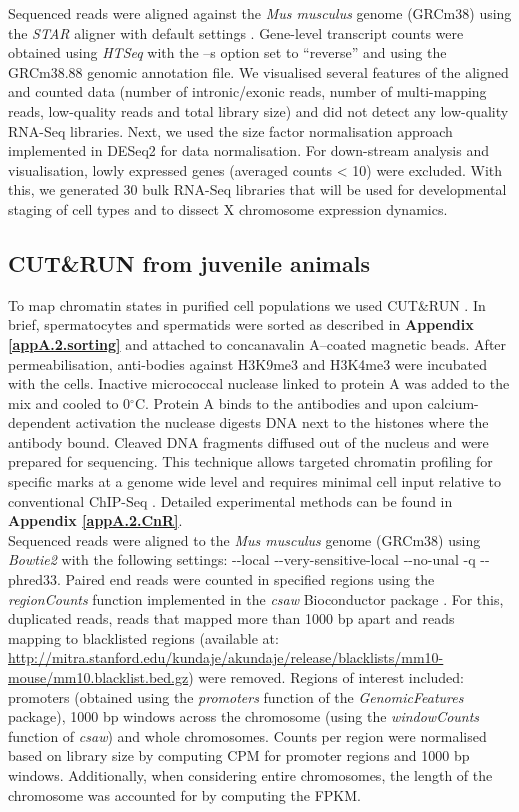 Sequenced reads were aligned against the \textit{Mus musculus} genome (GRCm38) using the \emph{STAR} aligner with default settings \citep{Dobin2013}. 
Gene-level transcript counts were obtained using \emph{HTSeq} \citep{Anders2014} with the –s option set to “reverse” and using the GRCm38.88 genomic annotation file. 
We visualised several features of the aligned and counted data (number of intronic/exonic reads, number of multi-mapping reads, low-quality reads and total library size) and did not detect any low-quality RNA-Seq libraries. 
Next, we used the size factor normalisation approach implemented in DESeq2 \citep{Love2014} for data normalisation. 
For down-stream analysis and visualisation, lowly expressed genes (averaged counts < 10) were excluded. 
With this, we generated 30 bulk RNA-Seq libraries that will be used for developmental staging of cell types and to dissect X chromosome expression dynamics.

\subsection{CUT\&{}RUN from juvenile animals}

To map chromatin states in purified cell populations we used CUT\&{}RUN \citep{Skene2018}. 
In brief, spermatocytes and spermatids were sorted as described in \textbf{Appendix \ref{appA.2.sorting}} and attached to concanavalin A–coated magnetic beads. 
After permeabilisation, anti-bodies against H3K9me3 and H3K4me3 were incubated with the cells. 
Inactive micrococcal nuclease linked to protein A was added to the mix and cooled to 0$^\circ$C. 
Protein A binds to the antibodies and upon calcium-dependent activation the nuclease digests DNA next to the histones where the antibody bound. Cleaved DNA fragments diffused out of the nucleus and were prepared for sequencing. 
This technique allows targeted chromatin profiling for specific marks at a genome wide level and requires minimal cell input relative to conventional ChIP-Seq \citep{Skene2018}. 
Detailed experimental methods can be found in \textbf{Appendix \ref{appA.2.CnR}}.\\

Sequenced reads were aligned to the \textit{Mus musculus} genome (GRCm38) using \textit{Bowtie2} with the following settings: -{}-local -{}-very-sensitive-local -{}-no-unal -q -{}-phred33. 
Paired end reads were counted in specified regions using the \textit{regionCounts} function implemented in the \textit{csaw} Bioconductor package \citep{Lun2015}. 
For this, duplicated reads, reads that mapped more than 1000 bp apart and reads mapping to blacklisted regions (available at: \url{http://mitra.stanford.edu/kundaje/akundaje/release/blacklists/mm10-mouse/mm10.blacklist.bed.gz}) were removed. 
Regions of interest included: promoters (obtained using the \textit{promoters} function of the \textit{GenomicFeatures} package), 1000 bp windows across the chromosome (using the \textit{windowCounts} function of \textit{csaw}) and whole chromosomes. 
Counts per region were normalised based on library size by computing \gls{CPM} for promoter regions and 1000 bp windows. 
Additionally, when considering entire chromosomes, the length of the chromosome was accounted for by computing the \gls{FPKM}. 

